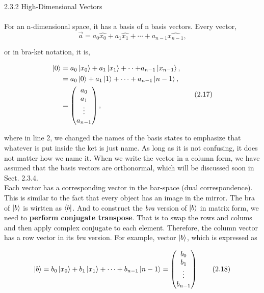 \documentclass{article}
\begin{document}
2.3.2 High-Dimensional Vectors\\
\\
For an n-dimensional space, it has a basis of n basis vectors. Every vector,
\begin{equation} \label{eq.2.16}
\overrightarrow{a}=a_{0}\hat{x_{0}}+a_{1}\hat{x_{1}}+\cdots+a_{n-1}\hat{x_{n-1}},\tag{2.16}
\end{equation}

or in bra-ket notation, it is,

\begin{align} \label{eq2.17}
    \begin{split}
        \ket{0}&={} a_{0}\ket{x_{0}}+a_{1}\ket{x_{1}}+\cdot\cdot+ a_{n-1}\ket{x_{n-1}},\\
    &=a_{0}\ket{0}+a_{1}\ket{1}+\cdots+ a_{n-1}\ket{n-1},\\
    &=
    \begin{pmatrix} a_{0} \\ 
    a_{1}  \\
    \vdots \\
    a_{n-1}
    \end{pmatrix}, 
    \end{split} \tag{2.17}
\end{align}

where in line 2, we changed the names of the basis states to emphasize that whatever is put inside the ket
is just name. As long as it is not confusing, it does not matter how we name it. When we write the vector 
in a column form, we have assumed that the basis vectors are orthonormal, which will be discussed soon in Sect. 2.3.4.\\
Each vector has a corresponding vector in the bar-space (dual correspondence).
This is similar to the fact that every object has an image in the mirror. 
The bra of $\ket{b}$ is wirtten as $\bra{b}$. And to construct the \textit{bra} version of
$\ket{b}$ in matrix form, we need to \textbf{perform conjugate transpose}.
That is to swap the rows and colums and then apply complex conjugate to each element.
Therefore, the column vector has a row vector in its \textit{bra} version.
For example, vector $\ket{b}$, which is expressed as

\begin{equation} \label{eq.2.18}
    \ket{b}=b_{0}\ket{x_{0}}+b_{1}\ket{x_{1}}+\cdots+b_{n-1}\ket{n-1}=
    \begin{pmatrix}
        b_{0}\\
        b_{1}\\
        \vdots\\
        b_{n-1}
    \end{pmatrix} \tag{2.18}
\end{equation} 
\end{document}
